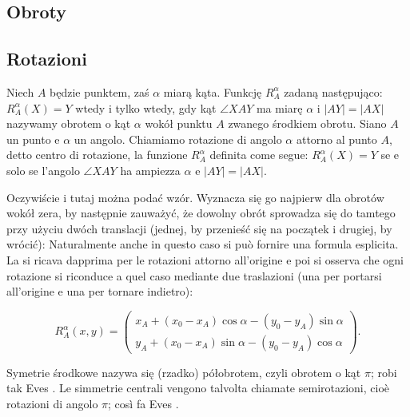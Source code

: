 
%

\subsection{Obroty} %
\subsection{Rotazioni} %

\begin{definition}
[obrót] %
[rotazione] %
    Niech $A$ będzie punktem, zaś $\alpha$ miarą kąta. %
    Funkcję $R_A^\alpha$ zadaną następująco: $R_A^\alpha(X) = Y$ wtedy i tylko wtedy, gdy kąt $\angle XAY$ ma miarę $\alpha$ i $|AY| = |AX|$ nazywamy obrotem o kąt $\alpha$ wokół punktu $A$ zwanego środkiem obrotu. %
    Siano $A$ un punto e $\alpha$ un angolo. %
    Chiamiamo rotazione di angolo $\alpha$ attorno al punto $A$, detto centro di rotazione, la funzione $R_A^\alpha$ definita come segue: $R_A^\alpha(X) = Y$ se e solo se l'angolo $\angle XAY$ ha ampiezza $\alpha$ e $|AY| = |AX|$. %
\end{definition}

Oczywiście i tutaj można podać wzór. %
Wyznacza się go najpierw dla obrotów wokół zera, by następnie zauważyć, że dowolny obrót sprowadza się do tamtego przy użyciu dwóch translacji (jednej, by przenieść się na początek i drugiej, by wrócić): %
Naturalmente anche in questo caso si può fornire una formula esplicita. %
La si ricava dapprima per le rotazioni attorno all'origine e poi si osserva che ogni rotazione si riconduce a quel caso mediante due traslazioni (una per portarsi all'origine e una per tornare indietro): %

\begin{equation}
    R_A^\alpha(x,y) = \begin{pmatrix}
        x_A + (x_0 - x_A) \cos \alpha - (y_0 - y_A) \sin \alpha\\
        y_A + (x_0 - x_A) \sin \alpha - (y_0 - y_A) \cos \alpha
    \end{pmatrix}.
\end{equation}

Symetrie środkowe nazywa się (rzadko) półobrotem, czyli obrotem o kąt $\pi$; robi tak Eves \cite[s. 105]{eves1_1972}. %
Le simmetrie centrali vengono talvolta chiamate semirotazioni, cioè rotazioni di angolo $\pi$; così fa Eves \cite[p. 105]{eves1_1972}. %

